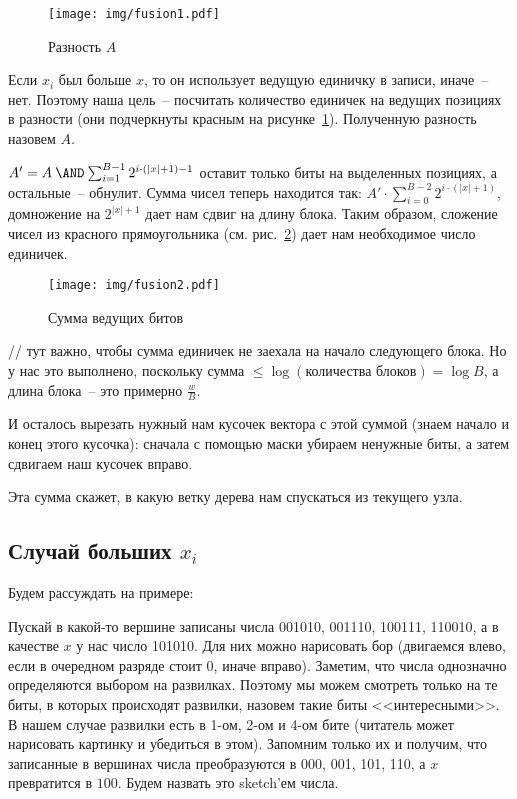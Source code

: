 \begin{figure}[h]
    \centering
    \label{difference}
    \texttt{[image: img/fusion1.pdf]}
    \caption{Разность $A$}
\end{figure}

Если $x_i$ был больше $x$, то он использует ведущую единичку в записи, иначе~-- нет. Поэтому наша цель~-- посчитать количество единичек на ведущих позициях в разности (они подчеркнуты красным на рисунке~\ref{difference}). Полученную разность назовем $A$.

$A' = A \mathbin{\AND} \sum_{i=1}^{B-1} 2^{i\cdot(|x|+1)-1}$ оставит только биты на выделенных позициях, а остальные~-- обнулит. Сумма чисел теперь находится так: $A' \cdot \sum_{i=0}^{B-2} 2^{i\cdot(|x|+1)}$, домножение на $2^{|x|+1}$ дает нам сдвиг на длину блока. Таким образом, сложение чисел из красного прямоугольника (см. рис.~\ref{sum}) дает нам необходимое число единичек.

\begin{figure}[h]
    \centering
    \label{sum}
    \texttt{[image: img/fusion2.pdf]}
    \caption{Сумма ведущих битов}
\end{figure}

// тут важно, чтобы сумма единичек не заехала на начало следующего блока. Но у нас это выполнено, поскольку сумма $\leqslant \log(\text{количества блоков}) = \log B$, а длина блока~-- это примерно $\frac{w}{B}$.

И осталось вырезать нужный нам кусочек вектора с этой суммой (знаем начало и конец этого кусочка): сначала с помощью маски убираем ненужные биты, а затем сдвигаем наш кусочек вправо.

Эта сумма скажет, в какую ветку дерева нам спускаться из текущего узла.

\bigskip

\subsection{Случай больших $x_i$}

Будем рассуждать на примере:

Пускай в какой-то вершине записаны числа 001010, 001110, 100111, 110010, а в качестве $x$ у нас число 101010. Для них можно нарисовать бор (двигаемся влево, если в очередном разряде стоит $0$, иначе вправо). Заметим, что числа однозначно определяются выбором на развилках. Поэтому мы можем смотреть только на те биты, в которых происходят развилки, назовем такие биты <<интересными>>. В нашем случае развилки есть в 1-ом, 2-ом и 4-ом бите (читатель может нарисовать картинку и убедиться в этом). Запомним только их и получим, что записанные в вершинах числа преобразуются в 000, 001, 101, 110, а $x$ превратится в $100$. Будем назвать это sketch'ем числа.

